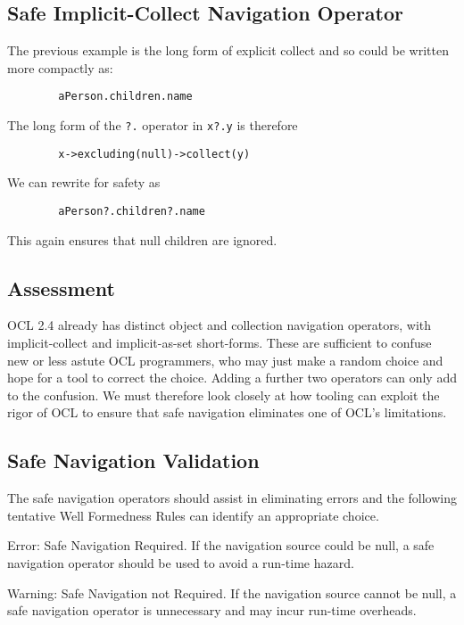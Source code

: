 \documentclass{llncs}
\begin{document}
\subsection{Safe Implicit-Collect Navigation Operator}

The previous example is the long form of explicit collect and so could be written more compactly as: 

\begin{verbatim}
        aPerson.children.name
\end{verbatim}

The long form of the \verb|?.| operator in  \verb|x?.y| is therefore

\begin{verbatim}
        x->excluding(null)->collect(y)
\end{verbatim}

We can rewrite for safety as

\begin{verbatim}
        aPerson?.children?.name
\end{verbatim}

This again ensures that null children are ignored.

\subsection{Assessment}

OCL 2.4 already has distinct object and collection navigation operators, with implicit-collect and implicit-as-set short-forms. These are sufficient to confuse new or less astute OCL programmers, who may just make a random choice and hope for a tool to correct the choice. Adding a further two operators can only add to the confusion. We must therefore look closely at how tooling can exploit the rigor of OCL to ensure that safe navigation eliminates one of OCL's limitations.

\subsection{Safe Navigation Validation}

The safe navigation operators should assist in eliminating errors and the following tentative Well Formedness Rules can identify an appropriate choice.

Error: Safe Navigation Required. If the navigation source could be null, a safe navigation operator should be used to avoid a run-time hazard.

Warning: Safe Navigation not Required. If the navigation source cannot be null, a safe navigation operator is unnecessary and may incur run-time overheads.
\end{document}
